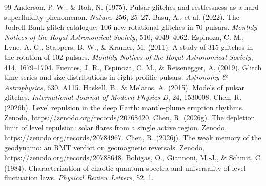 \documentclass[12pt,a4paper]{article}
\begin{document}
\begin{thebibliography}{99}
\small
{} Anderson, P. W., \& Itoh, N. (1975). Pulsar glitches and restlessness as a hard superfluidity phenomenon. \emph{Nature}, 256, 25--27.
 Basu, A., et al. (2022). The Jodrell Bank glitch catalogue: 106 new rotational glitches in 70 pulsars. \emph{Monthly Notices of the Royal Astronomical Society}, 510, 4049--4062.
 Espinoza, C. M., Lyne, A. G., Stappers, B. W., \& Kramer, M. (2011). A study of 315 glitches in the rotation of 102 pulsars. \emph{Monthly Notices of the Royal Astronomical Society}, 414, 1679--1704.
 Fuentes, J. R., Espinoza, C. M., \& Reisenegger, A. (2019). Glitch time series and size distributions in eight prolific pulsars. \emph{Astronomy \& Astrophysics}, 630, A115.
 Haskell, B., \& Melatos, A. (2015). Models of pulsar glitches. \emph{International Journal of Modern Physics D}, 24, 1530008.
 Chen, R. (2026b). Level repulsion in the deep Earth: mantle-plume eruption rhythms. Zenodo, \url{https://zenodo.org/records/20768420}.
 Chen, R. (2026g). The depletion limit of level repulsion: solar flares from a single active region. Zenodo, \url{https://zenodo.org/records/20784967}.
 Chen, R. (2026j). The weak memory of the geodynamo: an RMT verdict on geomagnetic reversals. Zenodo, \url{https://zenodo.org/records/20788648}.
 Bohigas, O., Giannoni, M.-J., \& Schmit, C. (1984). Characterization of chaotic quantum spectra and universality of level fluctuation laws. \emph{Physical Review Letters}, 52, 1.
\end{thebibliography}
\end{document}
